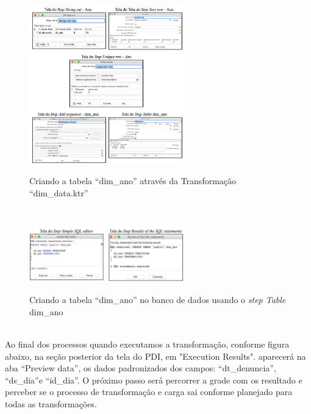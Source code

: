 \begin{figure}[H]
	\vspace*{0,2cm}
    \centering
    \caption{Criando a tabela ``dim\_ano'' atrav\'{e}s da Transforma\c{c}\~{a}o ``dim\_data.ktr''}
    \includegraphics[width=0.6\textwidth]{./04-figuras/figura-dim-ano}
    \label{fig:ilustfigdimano}
\end{figure}
\vspace*{-0,9cm}
{\raggedright {}} \\

\begin{figure}[H]
	\vspace*{0,2cm}
    \centering
    \caption{Criando a tabela ``dim\_ano'' no banco de dados usando o \textit{step Table} dim\_ano}
    \includegraphics[width=0.6\textwidth]{./04-figuras/figura-tb-dim-ano}
    \label{fig:ilustfigtbdimano}
\end{figure}
\vspace*{-0,9cm}
{\raggedright {}} \\

Ao final dos processos quando executamos a transforma\c{c}\~{a}o, conforme figura abaixo, na se\c{c}\~{a}o posterior da tela do PDI, 
em "Execution Results". aparecer\'{a} na aba ``Preview data'', os dados padronizados dos campos: 
``dt_denuncia'', ``ds_dia''e ``id_dia''. O pr\'{o}ximo passo ser\'{a} percorrer a grade com os resultado e 
perceber se o processo de transforma\c{c}\~{a}o e carga sai conforme planejado para todas as transforma\c{c}\~{o}es. 

